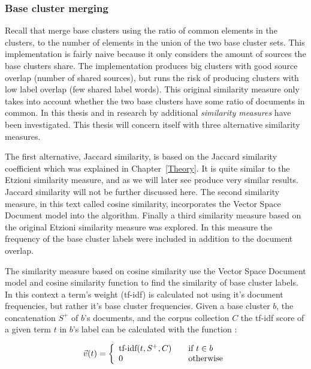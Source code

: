 \subsubsection{Base cluster merging}
\label{subsubsec:baseclustermerging}
Recall that \cite{Oren1998} merge base clusters using the ratio of common elements in the clusters, to the number of elements in the union of the two base cluster sets. This implementation is fairly naive because it only considers the amount of sources the base clusters share. The implementation produces big clusters with good source overlap (number of shared sources), but runs the risk of producing clusters with low label overlap (few shared label words). This original similarity measure only takes into account whether the two base clusters have some ratio of documents in common. In this thesis and in research by \citeauthor{Moe2014} additional \emph{similarity measures} have been investigated. This thesis will concern itself with three alternative similarity measures.

The first alternative, Jaccard similarity, is based on the Jaccard similarity coefficient which was explained in Chapter~\ref{Theory}. It is quite similar to the Etzioni similarity measure, and as we will later see produce very similar results. Jaccard similarity will not be further discussed here. The second similarity measure, in this text called cosine similarity, incorporates the Vector Space Document model into the \CTC algorithm. Finally a third similarity measure based on the original Etzioni similarity measure was explored. In this measure the frequency of the base cluster labels were included in addition to the document overlap.

The similarity measure based on cosine similarity use the Vector Space Document model and cosine similarity function to find the similarity of base cluster labels. In this context a term's weight (tf-idf) is calculated not using it's document frequencies, but rather it's base cluster frequencies. Given a base cluster \(b\), the concatenation \(S^+\) of \(b\)'s documents, and the corpus collection \(C\) the tf-idf score of a given term \(t\) in \(b\)'s label can be calculated with the function \parencite{Moe2014}:

\begin{displaymath}
\vec{v}(t) = \left\{
  \begin{array}{l l}
    \text{tf-idf}(t, S^+, C) & \quad \text{if $t \in b$}\\
    0 & \quad \text{otherwise}
  \end{array} \right.
\end{displaymath}


